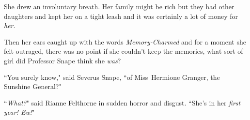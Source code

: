 She drew an involuntary breath. Her family might be rich but they had other daughters and kept her on a tight leash and it was certainly a lot of money for \emph{her}.

Then her ears caught up with the words \emph{Memory-Charmed} and for a moment she felt outraged, there was no point if she couldn't keep the memories, what sort of girl did Professor Snape think she \emph{was}?

``You surely know," said Severus Snape, ``of Miss~Hermione Granger, the Sunshine General?"

``\emph{What?}" said Rianne Felthorne in sudden horror and disgust. ``She's in her \emph{first year! Ew!}"

